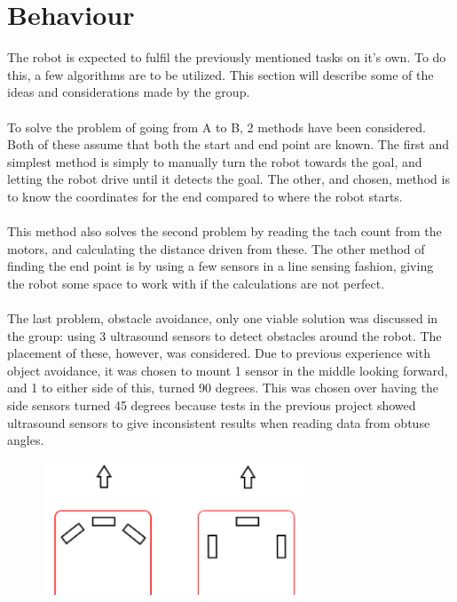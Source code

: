 \section{Behaviour}
The robot is expected to fulfil the previously mentioned tasks on it's own. To do this, a few algorithms are to be utilized. This section will describe some of the ideas and considerations made by the group.\\\\
To solve the problem of going from A to B, 2 methods have been considered. Both of these assume that both the start and end point are known. The first and simplest method is simply to manually turn the robot towards the goal, and letting the robot drive until it detects the goal. The other, and chosen, method is to know the coordinates for the end compared to where the robot starts.\\\\
This method also solves the second problem by reading the tach count from the motors, and calculating the distance driven from these. The other method of finding the end point is by using a few sensors in a line sensing fashion, giving the robot some space to work with if the calculations are not perfect.\\\\
The last problem, obstacle avoidance, only one viable solution was discussed in the group: using 3 ultrasound sensors to detect obstacles around the robot. The placement of these, however, was considered. Due to previous experience with object avoidance, it was chosen to mount 1 sensor in the middle looking forward, and 1 to either side of this, turned 90 degrees. This was chosen over having the side sensors turned 45 degrees because tests in the previous project showed ultrasound sensors to give inconsistent results when reading data from obtuse angles.

\begin{figure}[!ht]
	\centering
	\includegraphics[width=0.7\textwidth]{figures/sensorMountingTheory.PNG}
	\caption{}
	\label{Hardware diagram}
\end{figure}